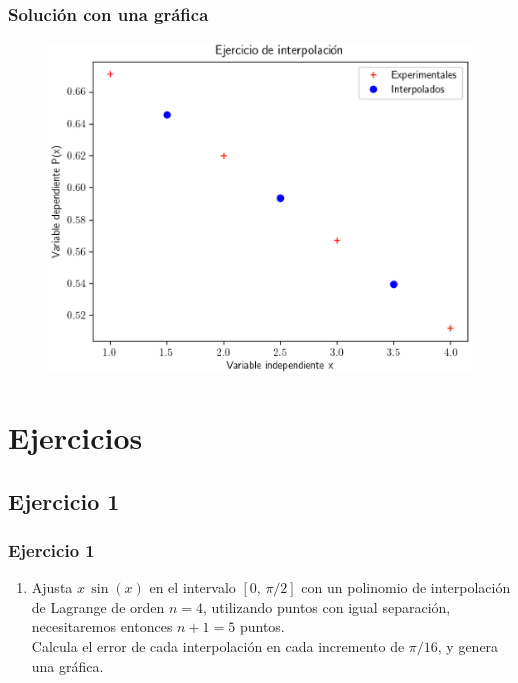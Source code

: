 \documentclass[12pt]{beamer}
\begin{document}
\begin{frame}
\frametitle{Solución con una gráfica}
\begin{figure}
	\centering
	\includegraphics[scale=0.6]{Imagenes/Ejercicio_Interpolacion_02.eps}
\end{figure}
\end{frame}

\section{Ejercicios}
\subsection{Ejercicio 1}

\begin{frame}
\frametitle{Ejercicio 1}
\begin{enumerate}[<+->]
\item Ajusta $x \, \sin(x)$ en el intervalo $[0, \, \pi/2]$ con un polinomio de interpolación de Lagrange de orden $n = 4$, utilizando puntos con igual separación, necesitaremos entonces $n + 1 = 5$ puntos.
\\
\bigskip
Calcula el error de cada interpolación en cada incremento de $\pi/16$, y genera una gráfica.
\seti
\end{enumerate}
\end{frame}
\end{document}
